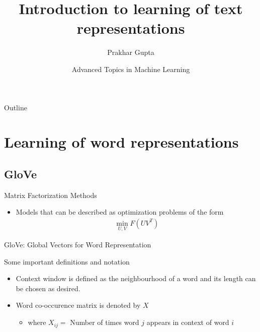 \documentclass{beamer}
\title[Text Representations]{Introduction to learning of text representations}
\author{Prakhar Gupta}
\institute[EPFL] %
{
  
  Department of Computer and Communication Sciences\\
  EPFL
}
\date[Advanced topics in ML]{Advanced Topics in Machine Learning}
\begin{document}
\begin{frame}
  \titlepage
\end{frame}

\begin{frame}{Outline}
  \tableofcontents
\end{frame}

\section{Learning of word representations}

\subsection{GloVe}

\begin{frame}{Matrix Factorization Methods}
  \begin{itemize}
   \item<2-> Models that can be described as optimization problems of the form
    \begin{align}
    \min_{U,V} F(UV^T)
    \end{align}
  \end{itemize}
\end{frame}

\begin{frame}{GloVe: Global Vectors for Word Representation}
  \begin{block}{Some important definitions and notation}
  \begin{itemize} 
     \item<2-> Context window is defined as the neighbourhood of a word and its length can be chosen 
     as desired.
     \item<3-> Word co-occurence matrix is denoted by $X$
      \begin{itemize}
       \item<4-> where $X_{ij} =$ Number of times word $j$ appears in context of word $i$
      \end{itemize}
    \end{itemize}
  \end{block}
\end{frame}
\end{document}

